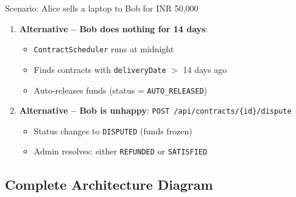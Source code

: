 \documentclass[11pt, a4paper]{article}
\begin{document}
\begin{examplebox}{Scenario: Alice sells a laptop to Bob for INR 50,000}
\begin{enumerate}[leftmargin=*]
    \item \textbf{Alternative -- Bob does nothing for 14 days}:
        \begin{itemize}
            \item \texttt{ContractScheduler} runs at midnight
            \item Finds contracts with \texttt{deliveryDate} $>$ 14 days ago
            \item Auto-releases funds (status = \texttt{AUTO\_RELEASED})
        \end{itemize}
    
    \item \textbf{Alternative -- Bob is unhappy}: \texttt{POST /api/contracts/\{id\}/dispute}
        \begin{itemize}
            \item Status changes to \texttt{DISPUTED} (funds frozen)
            \item Admin resolves: either \texttt{REFUNDED} or \texttt{SATISFIED}
        \end{itemize}
\end{enumerate}
\end{examplebox}

\subsection{Complete Architecture Diagram}
\end{document}
